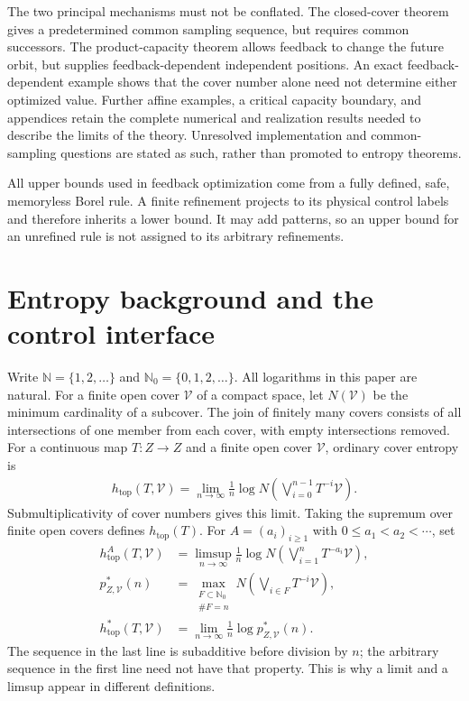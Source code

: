 \documentclass[11pt,reqno]{amsart}
\numberwithin{equation}{section}
\theoremstyle{definition}
\begin{document}
The two principal mechanisms must not be conflated. The closed-cover
theorem gives a predetermined common sampling sequence, but requires
common successors. The product-capacity theorem allows feedback to
change the future orbit, but supplies feedback-dependent independent
positions. An exact feedback-dependent example shows that the cover
number alone need not determine either optimized value. Further affine
examples, a critical capacity boundary, and appendices retain the
complete numerical and realization results needed to describe the
limits of the theory. Unresolved implementation and common-sampling
questions are stated as such, rather than promoted to entropy theorems.

All upper bounds used in feedback optimization come from a fully
defined, safe, memoryless Borel rule. A finite refinement projects to
its physical control labels and therefore inherits a lower bound.
It may add patterns, so an upper bound for an unrefined rule is not
assigned to its arbitrary refinements.
\section{Entropy background and the control interface}\label{sec:background}

Write $\mathbb N=\{1,2,\ldots\}$ and $\mathbb N_0=\{0,1,2,\ldots\}$.
All logarithms in this paper are natural. For a finite open cover
$\mathcal V$ of a compact space, let $N(\mathcal V)$ be the minimum
cardinality of a subcover. The join of finitely many covers consists of
all intersections of one member from each cover, with empty intersections
removed. For a continuous map $T:Z\to Z$ and a finite open cover
$\mathcal V$, ordinary cover entropy is
\begin{align*}
 h_{\mathrm{top}}(T,\mathcal V)
 =\lim_{n\to\infty}\frac1n\log N\left(
 \bigvee_{i=0}^{n-1}T^{-i}\mathcal V\right).
\end{align*}
Submultiplicativity of cover numbers gives this limit. Taking the
supremum over finite open covers defines $h_{\mathrm{top}}(T)$.
For $A=(a_i)_{i\ge1}$ with $0\le a_1<a_2<\cdots$, set
\begin{align*}
 h_{\mathrm{top}}^A(T,\mathcal V)
 &=\limsup_{n\to\infty}\frac1n\log N\left(
     \bigvee_{i=1}^nT^{-a_i}\mathcal V\right),\\
 p_{Z,\mathcal V}^*(n)
 &=\max_{\substack{F\subset\mathbb N_0\\\#F=n}}
    N\left(\bigvee_{i\in F}T^{-i}\mathcal V\right),\\
 h_{\mathrm{top}}^*(T,\mathcal V)
 &=\lim_{n\to\infty}\frac1n\log p_{Z,\mathcal V}^*(n).
\end{align*}
The sequence in the last line is subadditive before division by $n$;
the arbitrary sequence in the first line need not have that property.
This is why a limit and a limsup appear in different definitions.
\end{document}
